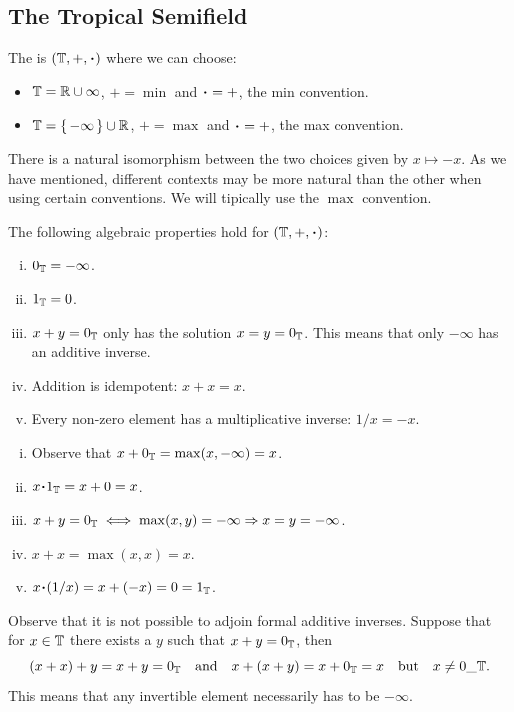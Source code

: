 \documentclass[12pt]{memoir}
\begin{document}
\subsection{The Tropical Semifield}

\begin{Def}
    The  is $(\bT,+,\.)$ where we can choose:
    \begin{itemize}
        \item $\mathbb{T}=\mathbb{R}\cup\infty$, $+=\min$ and $\.=+$, the min convention.
        \item $\mathbb{T}=\{\,-\infty\,\}\cup\mathbb{R}$, $+=\max$ and $\.=+$, the max convention.
    \end{itemize}
\end{Def}

There is a natural isomorphism between the two choices given by $x\mapsto -x$. As we have mentioned, different contexts may be more natural than the other when using certain conventions. We will tipically use the $\max$ convention. 

\begin{Prop}
The following algebraic properties hold for $(\bT,+,\.)$:
\begin{enumerate}[i)]
    \item $0_{\mathbb{T}}=-\infty$.
    \item $1_{\mathbb{T}}=0$.
    \item $x+y=0_{\mathbb{T}}$ only has the solution $x=y=0_{\mathbb{T}}$. This means that only $-\infty$ has an additive inverse.
    \item Addition is idempotent: $x+x=x$.
    \item Every non-zero element has a multiplicative inverse: $1/x=-x$.
\end{enumerate}
\end{Prop}

\begin{ptcbp}
    \begin{enumerate}[i)]
    \item Observe that $x+0_{\mathbb{T}}=\max(x,-\infty)=x$.
    \item $x\.1_\bT=x+0=x$.
    \item $x+y=0_{\mathbb{T}}\iff \max(x,y)=-\infty\Rightarrow x=y=-\infty$.
    \item $x+x=\max(x,x)=x$.
    \item $x\.(1/x)=x+(-x)=0=1_\bT$.
\end{enumerate}
\end{ptcbp}
Observe that it is not possible to adjoin formal additive inverses. Suppose that for $x\in\mathbb{T}$ there exists a $y$ such that $x+y=0_{\mathbb{T}}$, then 
$$(x+x)+y=x+y=0_{\mathbb{T}}\quad\text{and}\quad x+(x+y)=x+0_{\mathbb{T}}=x\quad\text{but}\quad x\neq 0\_\mathbb{T}.$$
This means that any invertible element necessarily has to be $-\infty$.
\end{document}
